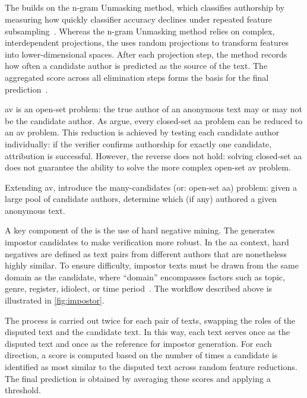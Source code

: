 \subsection{\impAppr{}}
\label{sec:impostor_method_theory}

The \impAppr{} builds on the n-gram Unmasking method, which classifies authorship by measuring how quickly classifier accuracy declines under repeated feature subsampling~\citep{koppel_authorship_2004}. 
Whereas the n-gram Unmasking method relies on complex, interdependent projections, the \impAppr{} uses random projections to transform features into lower-dimensional spaces.
After each projection step, the method records how often a candidate author is predicted as the source of the text. 
The aggregated score across all elimination steps forms the basis for the final prediction~\citep{tyo_state_2022}.

\ac{av} is an open-set problem: the true author of an anonymous text may or may not be the candidate author. 
As \citet{koppel_determining_2014} argue, every closed-set \ac{aa} problem can be reduced to an \ac{av} problem. 
This reduction is achieved by testing each candidate author individually: if the verifier confirms authorship for exactly one candidate, attribution is successful. 
However, the reverse does not hold: solving closed-set \ac{aa} does not guarantee the ability to solve the more complex open-set \ac{av} problem.

Extending \ac{av}, \citet{koppel_determining_2014} introduce the many-candidates (or: open-set \ac{aa}) problem: given a large pool of candidate authors, determine which (if any) authored a given anonymous text. 

A key component of the \impAppr{} is the use of hard negative mining. 
The \impAppr{} generates impostor candidates to make verification more robust. 
In the \ac{aa} context, hard negatives are defined as text pairs from different authors that are nonetheless highly similar. 
To ensure difficulty, impostor texts must be drawn from the same domain as the candidate, where “domain” encompasses factors such as topic, genre, register, idiolect, or time period~\citep{bischoff_importance_2020}. 
The workflow described above is illustrated in \autoref{fig:impostor}.

The process is carried out twice for each pair of texts, swapping the roles of the disputed text and the candidate text. 
In this way, each text serves once as the disputed text and once as the reference for impostor generation. 
For each direction, a score is computed based on the number of times a candidate is identified as most similar to the disputed text across random feature reductions. 
The final prediction is obtained by averaging these scores and applying a threshold.


